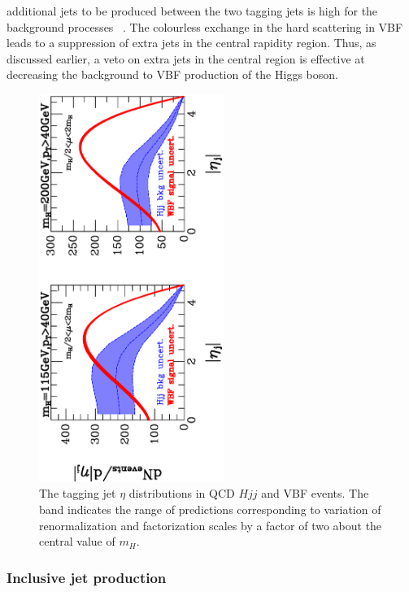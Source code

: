 \documentclass[12pt]{iopart}
\begin{document}
additional jets to be produced between the two tagging jets is high for the background processes~ \cite{DelDuca:2004wt}.
The colourless exchange in the hard scattering in VBF leads to a suppression of extra jets in the central rapidity region.
Thus, as discussed earlier, a veto on extra jets in the central region is effective at decreasing the background to VBF
production of the Higgs boson. 
%
\begin{figure}[t]
\begin{center}
\includegraphics[width=6cm,angle=-90]{absrap_compare.ps}
\end{center}
\vspace*{-0.5cm}
\caption{The tagging jet $\eta$ distributions in QCD $Hjj$ and VBF events. The band indicates the range of
predictions corresponding to variation of renormalization and factorization scales by a factor of two about
the central value of $m_H$.}
 
\label{fig:Hjj}
\end{figure}
%


\subsubsection{Inclusive jet production}
\label{sec:jetlhc}
\end{document}
